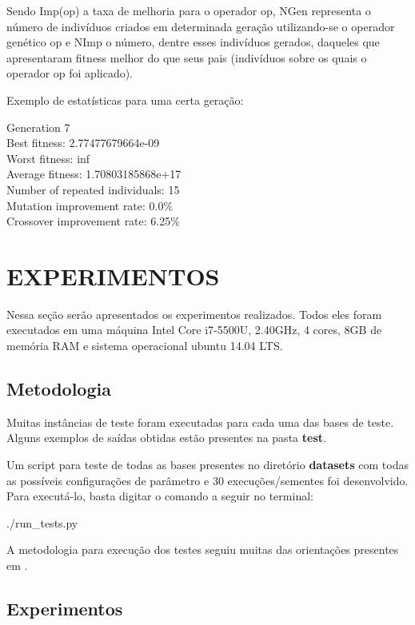 \documentclass[12pt]{article}
\begin{document}
Sendo Imp(op) a taxa de melhoria para o operador op, NGen representa o número de indivíduos
criados em determinada geração utilizando-se o operador genético op e NImp o número, dentre
esses indivíduos gerados, daqueles que apresentaram fitness melhor do que seus pais (indivíduos
sobre os quais o operador op foi aplicado).

Exemplo de estatísticas para uma certa geração:

\begin{center}
  Generation 7\\
  Best fitness: 2.77477679664e-09\\
  Worst fitness: inf\\
  Average fitness: 1.70803185868e+17\\
  Number of repeated individuals: 15\\
  Mutation improvement rate: 0.0\% \\
  Crossover improvement rate: 6.25\%
\end{center}

\section{EXPERIMENTOS}

Nessa seção serão apresentados os experimentos realizados. Todos eles foram executados em
uma máquina Intel Core i7-5500U, 2.40GHz, 4 cores, 8GB de memória RAM e sistema operacional
ubuntu 14.04 LTS.

\subsection{Metodologia}

Muitas instâncias de teste foram executadas para cada uma das bases de teste. Alguns exemplos
de saídas obtidas estão presentes na pasta \textbf{test}.

Um script para teste de todas as bases presentes no diretório \textbf{datasets} com todas as
possíveis configurações de parâmetro e 30 execuções/sementes foi desenvolvido. Para executá-lo,
basta digitar o comando a seguir no terminal:

\begin{center}
 ./run\_tests.py
\end{center}

A metodologia para execução dos testes seguiu muitas das orientações presentes em \cite{clalg:11}.

\subsection{Experimentos}
\end{document}
